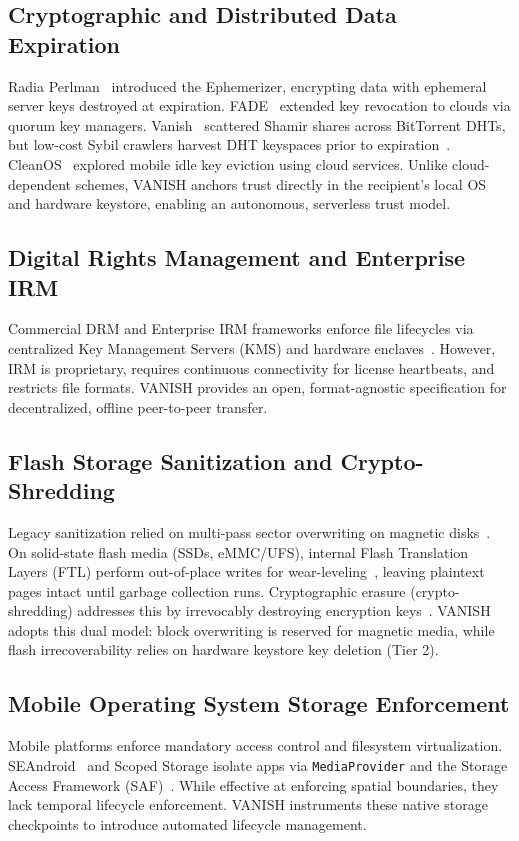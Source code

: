 \subsection{Cryptographic and Distributed Data Expiration}
Radia Perlman~\cite{perlman2005ephemerizer} introduced the Ephemerizer, encrypting data with ephemeral server keys destroyed at expiration. FADE~\cite{tang2010fade} extended key revocation to clouds via quorum key managers. Vanish~\cite{geambasu2009vanish} scattered Shamir shares across BitTorrent DHTs, but low-cost Sybil crawlers harvest DHT keyspaces prior to expiration~\cite{wolchok2010defeating}. CleanOS~\cite{tang2012cleanos} explored mobile idle key eviction using cloud services. Unlike cloud-dependent schemes, VANISH anchors trust directly in the recipient's local OS and hardware keystore, enabling an autonomous, serverless trust model.

\subsection{Digital Rights Management and Enterprise IRM}
Commercial DRM and Enterprise IRM frameworks enforce file lifecycles via centralized Key Management Servers (KMS) and hardware enclaves~\cite{armtrustzone}. However, IRM is proprietary, requires continuous connectivity for license heartbeats, and restricts file formats. VANISH provides an open, format-agnostic specification for decentralized, offline peer-to-peer transfer.

\subsection{Flash Storage Sanitization and Crypto-Shredding}
Legacy sanitization relied on multi-pass sector overwriting on magnetic disks~\cite{garfinkel2010}. On solid-state flash media (SSDs, eMMC/UFS), internal Flash Translation Layers (FTL) perform out-of-place writes for wear-leveling~\cite{wei2011reliably, reardon2013sok}, leaving plaintext pages intact until garbage collection runs. Cryptographic erasure (crypto-shredding) addresses this by irrevocably destroying encryption keys~\cite{diesburg2010survey, reardon2013sok}. VANISH adopts this dual model: block overwriting is reserved for magnetic media, while flash irrecoverability relies on hardware keystore key deletion (Tier 2).

\subsection{Mobile Operating System Storage Enforcement}
Mobile platforms enforce mandatory access control and filesystem virtualization. SEAndroid~\cite{smalley2013security} and Scoped Storage isolate apps via \texttt{MediaProvider} and the Storage Access Framework (SAF)~\cite{android_scoped_storage}. While effective at enforcing spatial boundaries, they lack temporal lifecycle enforcement. VANISH instruments these native storage checkpoints to introduce automated lifecycle management.
